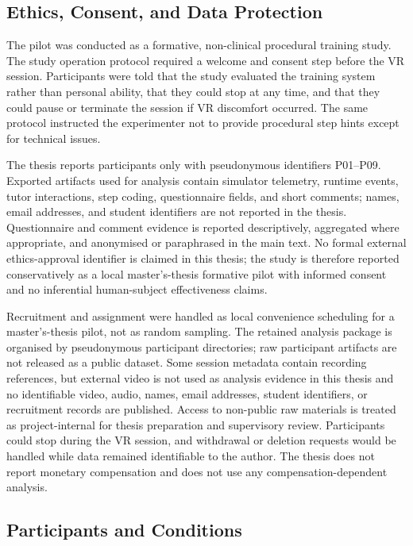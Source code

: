 \subsection{Ethics, Consent, and Data Protection}

The pilot was conducted as a formative, non-clinical procedural training study.
The study operation protocol required a welcome and consent step before the VR
session. Participants were told that the study evaluated the training system
rather than personal ability, that they could stop at any time, and that they
could pause or terminate the session if VR discomfort occurred. The same
protocol instructed the experimenter not to provide procedural step hints
except for technical issues.

The thesis reports participants only with pseudonymous identifiers
P01--P09. Exported artifacts used for analysis contain simulator telemetry,
runtime events, tutor interactions, step coding, questionnaire fields, and
short comments; names, email addresses, and student identifiers are not reported
in the thesis. Questionnaire and comment evidence is reported descriptively,
aggregated where appropriate, and anonymised or paraphrased in the main text.
No formal external ethics-approval identifier is claimed in this thesis; the
study is therefore reported conservatively as a local master's-thesis
formative pilot with informed consent and no inferential human-subject
effectiveness claims.

Recruitment and assignment were handled as local convenience scheduling for a
master's-thesis pilot, not as random sampling. The retained analysis package is
organised by pseudonymous participant directories; raw participant artifacts
are not released as a public dataset. Some session metadata contain recording
references, but external video is not used as analysis evidence in this thesis
and no identifiable video, audio, names, email addresses, student identifiers,
or recruitment records are published. Access to non-public raw materials is
treated as project-internal for thesis preparation and supervisory review.
Participants could stop during the VR session, and withdrawal or deletion
requests would be handled while data remained identifiable to the author. The
thesis does not report monetary compensation and does not use any
compensation-dependent analysis.

\subsection{Participants and Conditions}

